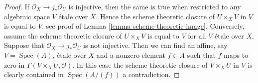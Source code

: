 \documentclass[10pt,a4paper]{amsart}
\theoremstyle{plain}
\theoremstyle{definition}
\theoremstyle{remark}
\numberwithin{equation}{subsection}
\def\Spec{\mathop{\mathrm{Spec}}}
\begin{document}
\begin{proof}
If $\mathcal{O}_X \to j_*\mathcal{O}_U$ is injective,
then the same is true when restricted to any
algebraic space $V$ \'etale over $X$.
Hence the scheme theoretic closure of $U \times_X V$ in $V$
is equal to $V$, see proof of
Lemma \ref{lemma-scheme-theoretic-image}.
Conversely, assume the scheme theoretic
closure of $U \times_X V$ is equal to $V$ for all $V$ \'etale over $X$.
Suppose that $\mathcal{O}_X \to j_*\mathcal{O}_U$ is not injective.
Then we can find an affine, say $V = \Spec(A)$, \'etale over $X$
and a nonzero element $f \in A$ such that $f$ maps to zero in
$\Gamma(V \times_X U, \mathcal{O})$. In this case the scheme theoretic
closure of $V \times_X U$ in $V$ is clearly contained in $\Spec(A/(f))$
a contradiction.
\end{proof}
\end{document}
